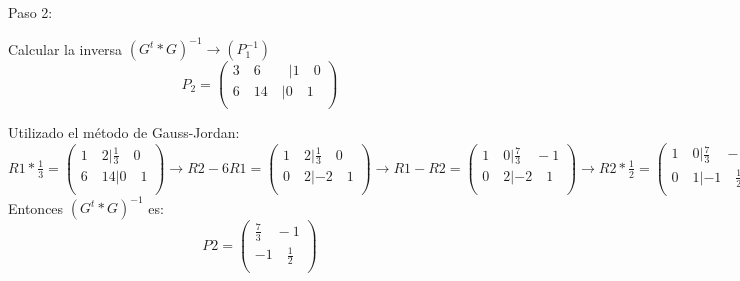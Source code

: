 \documentclass[
	11pt, %
]{beamer}
\begin{document}
\begin{frame}
  Paso 2:

  \bigskip %

  Calcular la inversa $(G^{t}*G)^{-1} \rightarrow (P_{1}^{-1})$\\

  \[P_{2} = \begin{pmatrix}
    3 \quad  6 \qquad | 1 \quad 0 \\
    6 \quad 14 \quad | 0 \quad 1 \\
  \end{pmatrix}\]
  
  Utilizado el método de Gauss-Jordan:\\

  $R1*\frac{1}{3} = \begin{pmatrix}
    1 \quad 2 | \frac{1}{3} \quad 0\\
    6 \quad14 | 0 \quad 1\\
  \end{pmatrix} \rightarrow R2 - 6R1 = \begin{pmatrix}
    1 \quad 2 | \frac{1}{3} \quad 0\\
    0 \quad 2 | -2 \quad 1\\
  \end{pmatrix} \rightarrow R1-R2 = \begin{pmatrix}
    1 \quad 0 | \frac{7}{3} \quad -1\\
    0 \quad 2 | -2 \quad 1\\
  \end{pmatrix} \rightarrow R2 * \frac{1}{2} = \begin{pmatrix}
    1 \quad 0 | \frac{7}{3} \quad -1\\
    0 \quad 1 | -1 \quad \frac{1}{2}\\
  \end{pmatrix}$\\

  Entonces $(G^{t}*G)^{-1}$ es: \\
  \[P2 = \begin{pmatrix}
    \frac{7}{3} \quad -1\\
    -1 \quad \frac{1}{2}\\
  \end{pmatrix}\]
\end{frame}
\end{document}

